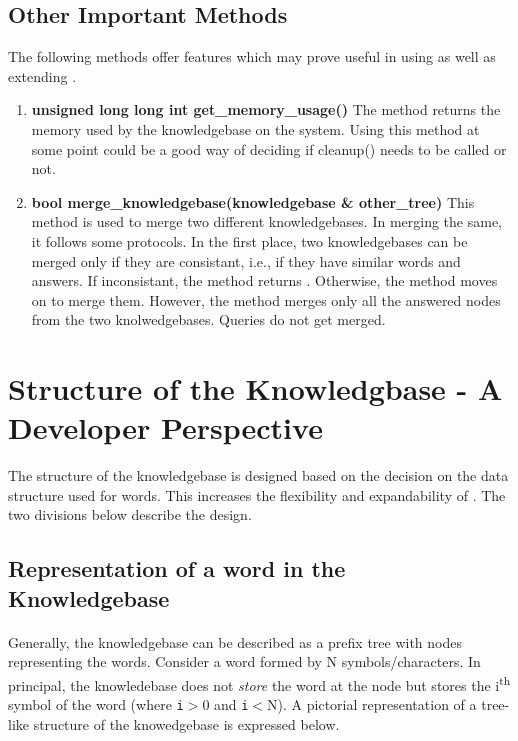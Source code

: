 \subsection*{Other Important Methods}
The following methods offer features which may prove useful in using as well as extending \libalf.
\begin{enumerate}
\item \textbf{unsigned long long int get\_memory\_usage()} \vskip 1pt
The method returns the memory used by the knowledgebase on the system. Using this method at some point could be a good way of deciding if cleanup() needs to be called or not. 
		
\item \textbf{bool merge\_knowledgebase(knowledgebase \& other\_tree)} \vskip 1pt
This method is used to merge two different knowledgebases. In merging the same, it follows some protocols. In the first place, two knowledgebases can be merged only if they are consistant, i.e., if they have similar words and answers. If inconsistant, the method returns \false. Otherwise, the method moves on to merge them. However, the method merges only all the answered nodes from the two knolwedgebases. Queries do not get merged. 

\end{enumerate}



\section{Structure of the Knowledgbase - A Developer Perspective}
The structure of the knowledgebase is designed based on the decision on the data structure used for words. This increases the flexibility and expandability of \libalf. The two divisions below describe the design.

\subsection{Representation of a word in the Knowledgebase}
\paragraph{}
Generally, the knowledgebase can be described as a prefix tree with nodes representing the words. Consider a word formed by N symbols/characters. In principal, the knowledebase does not \emph{store} the word at the node but stores the i\textsuperscript{th} symbol of the word (where \texttt{i}$>$0 and \texttt{i}$<$N). A pictorial representation of a tree-like structure of the knowedgebase is expressed below.

